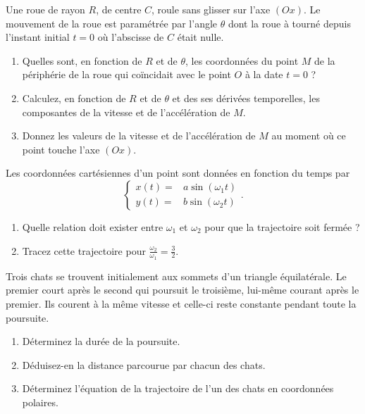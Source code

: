 \begin{exercice}
  Une roue de rayon \(R\), de centre \(C\), roule sans glisser sur l'axe \((Ox)\). Le mouvement de la roue est paramétrée par l'angle \(\theta\) dont la roue à tourné depuis l'instant initial \(t=0\) où l'abscisse de \(C\) était nulle.
  \begin{enumerate}
  \item Quelles sont, en fonction de \(R\) et de \(\theta\), les coordonnées du point \(M\) de la périphérie de la roue qui coïncidait avec le point \(O\) à la date \(t=0\) ?
  \item Calculez, en fonction de \(R\) et de \(\theta\) et des ses dérivées temporelles, les composantes de la vitesse et de l'accélération de \(M\).
  \item Donnez les valeurs de la vitesse et de l'accélération de \(M\) au moment où ce point touche l'axe \((Ox)\).
  \end{enumerate}
\end{exercice}
%
\begin{exercice}
  Les coordonnées cartésiennes d'un point sont données en fonction du temps par
  \begin{equation}
    \begin{cases}
      x(t)=&a\sin(\omega_1 t)\\
      y(t)=&b\sin(\omega_2 t)
    \end{cases}.
  \end{equation}
  \begin{enumerate}
  \item Quelle relation doit exister entre \(\omega_1\) et \(\omega_2\) pour que la trajectoire soit fermée ?
  \item Tracez cette trajectoire pour \(\frac{\omega_2}{\omega_1}=\frac{3}{2}\).
  \end{enumerate}
\end{exercice}
%
\begin{exercice}
  Trois chats se trouvent initialement aux sommets d'un triangle équilatérale. Le premier court après le second qui poursuit le troisième, lui-même courant après le premier. Ils courent à la même vitesse et celle-ci reste constante pendant toute la poursuite.
  \begin{enumerate}
  \item Déterminez la durée de la poursuite.
  \item Déduisez-en la distance parcourue par chacun des chats.
  \item Déterminez l'équation de la trajectoire de l'un des chats en coordonnées polaires.
  \end{enumerate}
\end{exercice}

